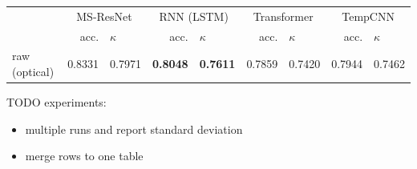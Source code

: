 \documentclass[%
  aspectratio=169,
  9pt,
ngerman,
  light,
  mathserif,
  professionalfont,
  affiliationintitlepagehead,
  titlegraphic,
   affiliation,
   navigationbar,
  progressbar,
]{beamer}
\begin{document}
{\begin{frame}
\begin{tabular}{lrlrlrlrl}
	\toprule
	& \multicolumn{2}{c}{MS-ResNet} & \multicolumn{2}{c}{RNN (LSTM)} & \multicolumn{2}{c}{Transformer} & \multicolumn{2}{c}{TempCNN} \\
	& acc. & $\kappa$ & acc. & $\kappa$ & acc. & $\kappa$ & acc. & $\kappa$ \\
	\cmidrule(lr){2-3}\cmidrule(lr){4-5} \cmidrule(lr){6-7}\cmidrule(lr){8-9}
	raw (optical)		 & 0.8331 & 0.7971 & \textbf{0.8048} & \textbf{0.7611} & 0.7859 & 0.7420 & 0.7944 & 0.7462 \\
	\bottomrule
\end{tabular}

TODO experiments:
\begin{itemize}
	\item multiple runs and report standard deviation
	\item merge rows to one table
\end{itemize}

\end{frame}


%



}
\end{document}
